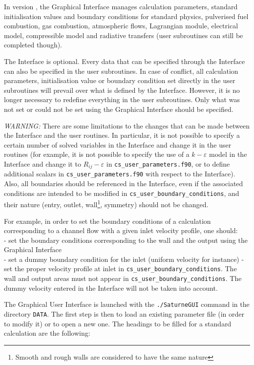 {{{{In version \verscs, the Graphical Interface manages calculation parameters,
standard initialisation values and boundary
conditions for standard physics, pulverised fuel combustion, gas combustion,
atmospheric flows, Lagrangian module,  electrical model, compressible model and radiative
transfers (user subroutines can still be completed though).

The Interface is optional. Every data that can be specified through the
Interface can also be specified in the user subroutines. In case of
conflict, all calculation parameters, initialisation value or boundary condition
set directly in the user subroutines will prevail over what is defined by the
Interface. However, it is no longer necessary to redefine everything in the
user subroutines. Only what was not set or could not be set using the Graphical
Interface should be specified.

{\em WARNING: }
There are some limitations to the changes that can be made between the Interface
and the user routines. In particular, it is not possible to specify a certain
number of solved variables in the Interface and change it in the user routines
(for example, it is not possible to specify the use of a $k-\varepsilon$ model
in the Interface and change it to $R_{ij}-\varepsilon$ in \texttt{cs\_user\_parameters.f90}, or
to define additional scalars in \texttt{cs\_user\_parameters.f90} with respect to the
Interface). Also, all boundaries should be referenced in the Interface, even if
the associated conditions are intended to be modified in \texttt{cs\_user\_boundary\_conditions}, and
their nature (entry, outlet, wall\footnote{Smooth and rough walls are considered
to have the same nature}, symmetry) should not be changed.

For example, in order to set the boundary conditions of a calculation
corresponding to a channel flow with a given inlet velocity profile, one
should:\\
- set the boundary conditions corresponding to the wall and the output
using the Graphical Interface\\
- set a dummy boundary condition for the inlet (uniform velocity for instance)
- set the proper velocity profile at inlet in \texttt{cs\_user\_boundary\_conditions}. The wall and
output areas must not appear in \texttt{cs\_user\_boundary\_conditions}. The dummy velocity
entered in the Interface will not be taken into account.

The Graphical User Interface is launched with the \texttt{./SaturneGUI} command
in the directory \texttt{DATA}. The first step is
then to load an existing parameter file (in order to modify it) or to
open a new one. The headings to be filled for a standard calculation are the
following:

}}}}
